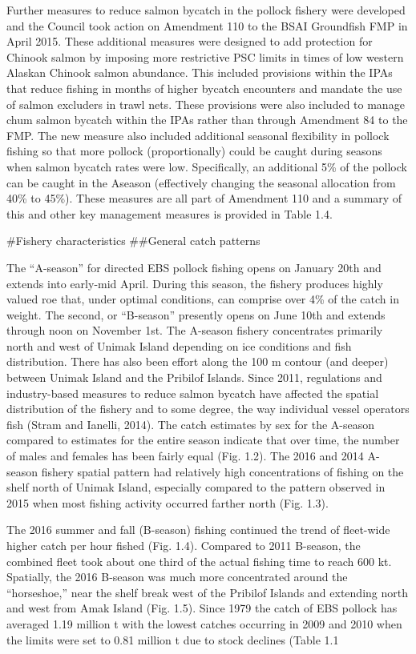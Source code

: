 Further measures to reduce salmon bycatch in the pollock fishery were
developed and the Council took action on Amendment 110 to the BSAI
Groundfish FMP in April 2015. These additional measures were designed to
add protection for Chinook salmon by imposing more restrictive PSC
limits in times of low western Alaskan Chinook salmon abundance. This
included provisions within the IPAs that reduce fishing in months of
higher bycatch encounters and mandate the use of salmon excluders in
trawl nets. These provisions were also included to manage chum salmon
bycatch within the IPAs rather than through Amendment 84 to the FMP. The
new measure also included additional seasonal flexibility in pollock
fishing so that more pollock (proportionally) could be caught during
seasons when salmon bycatch rates were low. Specifically, an additional
5\% of the pollock can be caught in the Aseason (effectively changing
the seasonal allocation from 40\% to 45\%). These measures are all part
of Amendment 110 and a summary of this and other key management measures
is provided in Table 1.4.

\#Fishery characteristics \#\#General catch patterns

The ``A-season'' for directed EBS pollock fishing opens on January 20th
and extends into early-mid April. During this season, the fishery
produces highly valued roe that, under optimal conditions, can comprise
over 4\% of the catch in weight. The second, or ``B-season'' presently
opens on June 10th and extends through noon on November 1st. The
A-season fishery concentrates primarily north and west of Unimak Island
depending on ice conditions and fish distribution. There has also been
effort along the 100 m contour (and deeper) between Unimak Island and
the Pribilof Islands. Since 2011, regulations and industry-based
measures to reduce salmon bycatch have affected the spatial distribution
of the fishery and to some degree, the way individual vessel operators
fish (Stram and Ianelli, 2014). The catch estimates by sex for the
A-season compared to estimates for the entire season indicate that over
time, the number of males and females has been fairly equal (Fig. 1.2).
The 2016 and 2014 A-season fishery spatial pattern had relatively high
concentrations of fishing on the shelf north of Unimak Island,
especially compared to the pattern observed in 2015 when most fishing
activity occurred farther north (Fig. 1.3).

The 2016 summer and fall (B-season) fishing continued the trend of
fleet-wide higher catch per hour fished (Fig. 1.4). Compared to 2011
B-season, the combined fleet took about one third of the actual fishing
time to reach 600 kt. Spatially, the 2016 B-season was much more
concentrated around the ``horseshoe,'' near the shelf break west of the
Pribilof Islands and extending north and west from Amak Island (Fig.
1.5). Since 1979 the catch of EBS pollock has averaged 1.19 million t
with the lowest catches occurring in 2009 and 2010 when the limits were
set to 0.81 million t due to stock declines (Table 1.1


